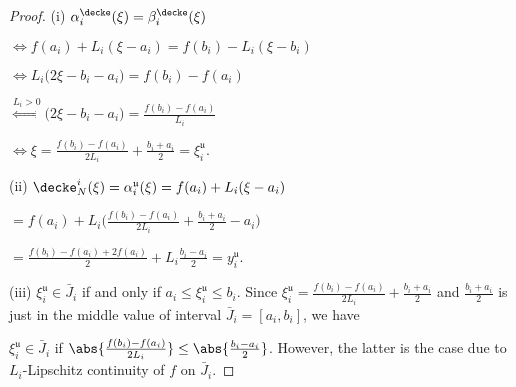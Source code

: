 \begin{lem}
\begin{proof}
(i) $\alpha^\decke_i(\xi) = \beta^\decke_i(\xi)$

$\Leftrightarrow  f(a_i) + L_i (\xi - a_i) = f(b_i) -L_i (\xi - b_i)$

$\Leftrightarrow  L_i \bigl( 2 \xi - b_i  - a_i\bigr) = f(b_i) - f(a_i) $

$\stackrel{L_i > 0}{\Leftrightarrow}   \bigl( 2 \xi - b_i  - a_i\bigr) = \frac{f(b_i) - f(a_i)}{L_i} $

$\Leftrightarrow   \xi  = \frac{f(b_i) - f(a_i)}{2 L_i}  + \frac{b_i+a_i}{2} = \xi^{\mathfrak u}_i$.

(ii) $\decke_N^i(\xi) = \alpha_i^{\mathfrak u} (\xi) =  f(a_i) + L_i (\xi - a_i) $

$= f(a_i) + L_i \bigl( \frac{f(b_i) - f(a_i)}{2 L_i}  + \frac{b_i+a_i}{2} - a_i \bigr) $ 

$=  \frac{f(b_i) - f(a_i) + 2f(a_i)}{2 }  + L_i \frac{b_i-a_i}{2}   = y_i^{\mathfrak u}$. 

(iii) $\xi^{\mathfrak u}_i \in \bar J_i$ if and only if $a_i \leq \xi^{\mathfrak u}_i \leq b_i$. Since $\xi^{\mathfrak u}_i = \frac{f(b_i) - f(a_i)}{2 L_i}  + \frac{b_i+a_i}{2}$ and $\frac{b_i+a_i}{2}$ is just in the middle value of interval $\bar J_i = [a_i,b_i]$, we have 

$\xi^{\mathfrak u}_i \in \bar J_i$ if $\abs{\frac{f(b_i) - f(a_i)}{2 L_i}} \leq \abs{\frac{b_i-a_i}{2}}$.
However, the latter is the case due to $L_i$-Lipschitz continuity of $f$ on $\bar J_i$.  
\end{proof}

\end{lem}



